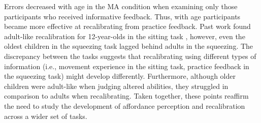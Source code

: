 \documentclass[a4paper,man,natbib,floatsintext,noextraspace]{apa6}
\begin{document}
Errors decreased with age in the MA condition when examining only those participants who received informative feedback. Thus, with age participants became more effective at recalibrating from practice feedback. Past work found adult-like recalibration for 12-year-olds in the sitting task \citep{ChenRecal}, however, even the oldest children in the squeezing task lagged behind adults in the squeezing. The discrepancy between the tasks suggests that recalibrating using different types of information (i.e., movement experience in the sitting task, practice feedback in the squeezing task) might develop differently. Furthermore, although older children were adult-like when judging altered abilities, they struggled in comparison to adults when recalibrating. Taken together, these points reaffirm the need to study the development of affordance perception and recalibration across a wider set of tasks. 



\end{document}
